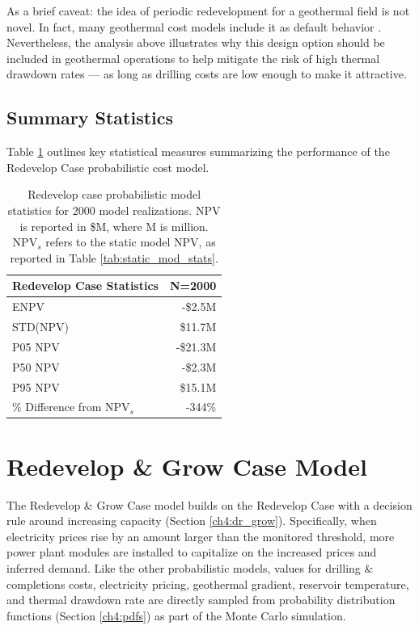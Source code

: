 As a brief caveat: the idea of periodic redevelopment for a geothermal field is not novel. In fact, many geothermal cost models include it as default behavior \citep[e.g.,\ ][]{entingh_volume_2006, blair_system_2018}. Nevertheless, the analysis above illustrates why this design option should be included in geothermal operations to help mitigate the risk of high thermal drawdown rates --- as long as drilling costs are low enough to make it attractive. 

\subsection{Summary Statistics}
\label{ch6:redevelop_stats}

Table \ref{tab:redevelop_stats} outlines key statistical measures summarizing the performance of the Redevelop Case probabilistic cost model.

\begin{table}[H]
\centering
\begin{tabular}{|l|r|}
\hline
\textbf{Redevelop Case Statistics} & N=2000 \\ \hline
ENPV & -\$2.5M \\ \hline
STD(NPV) & \$11.7M \\ \hline
P05 NPV & -\$21.3M \\ \hline
P50 NPV & -\$2.3M \\ \hline
P95 NPV & \$15.1M \\ \hline
\% Difference from NPV$_{s}$ & -344\% \\ \hline
\end{tabular}
\caption[Probabilistic Redevelop Case statistics]{Redevelop case probabilistic model statistics for 2000 model realizations. NPV is reported in \$M, where M is million. NPV$_s$ refers to the static model NPV, as reported in Table \ref{tab:static_mod_stats}.}
\label{tab:redevelop_stats}
\end{table}

\section{Redevelop \& Grow Case Model}
\label{ch6:grow_case}

The Redevelop \& Grow Case model builds on the Redevelop Case with a decision rule around increasing capacity (Section \ref{ch4:dr_grow}). Specifically, when electricity prices rise by an amount larger than the monitored threshold, more power plant modules are installed to capitalize on the increased prices and inferred demand. Like the other probabilistic models, values for drilling \& completions costs, electricity pricing, geothermal gradient, reservoir temperature, and thermal drawdown rate are directly sampled from probability distribution functions (Section \ref{ch4:pdfs}) as part of the Monte Carlo simulation.


